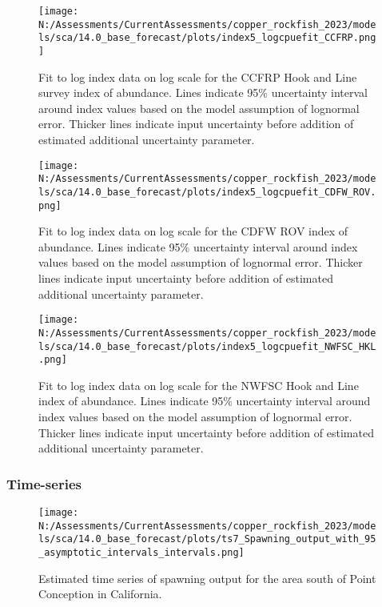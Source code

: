 \documentclass[11pt,
  english,
  letterpaper,
]{article}
\begin{document}
\pagebreak

\begin{figure}
\centering
\texttt{[image: N:/Assessments/CurrentAssessments/copper\_rockfish\_2023/models/sca/14.0\_base\_forecast/plots/index5\_logcpuefit\_CCFRP.png]}
\caption{Fit to log index data on log scale for the CCFRP Hook and Line survey index of abundance. Lines indicate 95\% uncertainty interval around index values based on the model assumption of lognormal error. Thicker lines indicate input uncertainty before addition of estimated additional uncertainty parameter.\label{fig:ccfrp-index-fit}}
\end{figure}

\pagebreak

\begin{figure}
\centering
\texttt{[image: N:/Assessments/CurrentAssessments/copper\_rockfish\_2023/models/sca/14.0\_base\_forecast/plots/index5\_logcpuefit\_CDFW\_ROV.png]}
\caption{Fit to log index data on log scale for the CDFW ROV index of abundance. Lines indicate 95\% uncertainty interval around index values based on the model assumption of lognormal error. Thicker lines indicate input uncertainty before addition of estimated additional uncertainty parameter.\label{fig:rov-index-fit}}
\end{figure}

\pagebreak

\begin{figure}
\centering
\texttt{[image: N:/Assessments/CurrentAssessments/copper\_rockfish\_2023/models/sca/14.0\_base\_forecast/plots/index5\_logcpuefit\_NWFSC\_HKL.png]}
\caption{Fit to log index data on log scale for the NWFSC Hook and Line index of abundance. Lines indicate 95\% uncertainty interval around index values based on the model assumption of lognormal error. Thicker lines indicate input uncertainty before addition of estimated additional uncertainty parameter.\label{fig:nwfsc-hkl-index-fit}}
\end{figure}

\pagebreak

\hypertarget{time-series}{%
\subsubsection{Time-series}\label{time-series}}

\begin{figure}
\centering
\texttt{[image: N:/Assessments/CurrentAssessments/copper\_rockfish\_2023/models/sca/14.0\_base\_forecast/plots/ts7\_Spawning\_output\_with\_95\_asymptotic\_intervals\_intervals.png]}
\caption{Estimated time series of spawning output for the area south of Point Conception in California.\label{fig:ssb}}
\end{figure}
\end{document}
